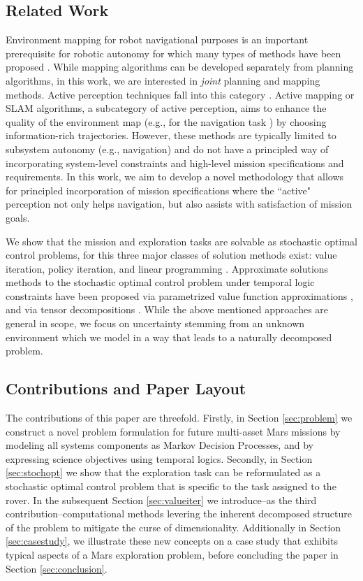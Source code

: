 \documentclass[conference]{IEEEtran}
\renewcommand{\cite}[1]{\citep{#1}}
\begin{document}
\subsection{Related Work}
Environment mapping for robot navigational purposes is an important prerequisite for robotic autonomy for which many types of methods have been proposed \cite{stachniss2009_book,Thrun2005,thrun2002robotic}. While mapping algorithms can be developed separately from planning algorithms, in this work, we are interested in \emph{joint} planning and mapping methods. Active perception techniques fall into this category \cite{aloimonos1988active,blake1992active,soatto2013actionable}. Active mapping or SLAM algorithms, a subcategory of active perception, aims to enhance the quality of the environment map (e.g., for the navigation task \cite{Agha2017_ISRR,davison2002simultaneous,feder1999adaptive,Mu16-CDC}) by choosing information-rich trajectories. However, these methods are typically limited to subsystem autonomy (e.g., navigation) and do not have a principled way of incorporating system-level constraints and high-level mission specifications and requirements. In this work, we aim to develop a novel methodology that allows for principled incorporation of mission specifications where the ``active" perception not only helps navigation, but also assists with satisfaction of mission goals.

We show that the mission and exploration tasks are solvable as   stochastic optimal control problems, for this 
three major classes of solution methods exist: value iteration, policy iteration, and linear programming \cite{Bertsekas1978}. Approximate solutions methods to the stochastic optimal control problem under temporal logic constraints have been proposed via parametrized value function approximations \cite{Leong2016,Papusha2016}, and via tensor decompositions \cite{Alora2016}. While the above mentioned approaches are general in scope, we focus on uncertainty stemming from an unknown environment which we model in a way that leads to a naturally decomposed problem.


\subsection{Contributions and Paper Layout}

The contributions of this paper are threefold. Firstly, in Section \ref{sec:problem} we construct a novel problem formulation for future multi-asset Mars missions by modeling all systems components as Markov Decision Processes, and by expressing science objectives using temporal logics. Secondly, in Section \ref{sec:stochopt} we show that the exploration task can be reformulated as a stochastic optimal control problem that is specific to the task assigned to the rover. In the subsequent Section \ref{sec:valueiter} we introduce--as the third contribution--computational methods levering the inherent decomposed structure of the problem to mitigate the curse of dimensionality. Additionally in Section \ref{sec:casestudy}, we illustrate these new concepts on a case study that exhibits typical aspects of a Mars exploration problem, before concluding the paper in Section \ref{sec:conclusion}.
\end{document}
